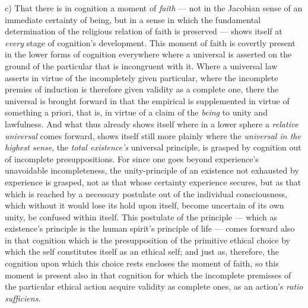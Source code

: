 \documentclass[12pt,a4paper]{book}
\begin{document}
c) That there is in cognition a moment of \emph{faith} --- not in the Jacobian
sense of an immediate certainty of being, but in a sense in which the
fundamental determination of the religious relation of faith is preserved ---
shows itself at \emph{every} stage of cognition's development. This moment of
faith is covertly present in the lower forms of cognition everywhere where a
universal is asserted on the ground of the particular that is incongruent with
it. Where a universal law asserts in virtue of the incompletely given
particular, where the incomplete premiss of induction is therefore given
validity as a complete one, there the universal is brought forward in that the
empirical is supplemented in virtue of something a priori, that is, in virtue
of a claim of the \emph{being} to unity and lawfulness. And what thus already
shows itself where in a lower sphere a \emph{relative universal} comes
forward, shows itself still more plainly where the \emph{universal in the
highest sense}, the \emph{total existence's}
universal principle, is grasped by cognition out of incomplete presuppositions.
For since one goes beyond experience's unavoidable incompleteness, the
unity-principle of an existence not exhausted by experience is grasped, not as
that whose certainty experience secures, but as that which is reached by a
necessary postulate out of the individual consciousness, which without it
would lose its hold upon itself, become uncertain of its own unity, be
confused within itself. This postulate of the principle --- which as
existence's principle is the human spirit's principle of life --- comes
forward also in that cognition which is the presupposition of the primitive
ethical choice by which the self constitutes itself as an ethical self; and
just as, therefore, the cognition upon which this choice rests encloses the
moment of faith, so this moment is present also in that cognition for which
the incomplete premisses of the particular ethical action acquire validity as
complete ones, as an action's \textit{ratio sufficiens}.
\end{document}
